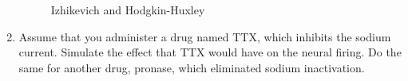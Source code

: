 \documentclass[11pt]{article}
\begin{document}
\begin{enumerate}
		\begin{figure}[htb]
			\centering
			\caption{Izhikevich and Hodgkin-Huxley}
		\end{figure}
		
		\item Assume that you administer a drug named TTX, which inhibits the sodium current. Simulate the effect that TTX would have on the neural firing. Do the same for another drug, pronase, which eliminated sodium inactivation.
		

\end{enumerate}
\end{document}
